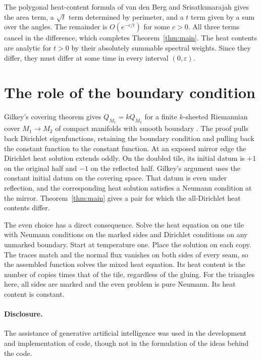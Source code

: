 \documentclass[11pt]{article}
\begin{document}
The polygonal heat-content formula of van den Berg and
Srisatkunarajah \cite[Theorem~1]{bs} gives the area term, a
$\sqrt t$ term determined by perimeter, and a $t$ term given by a
sum over the angles. The remainder is $O(e^{-c/t})$ for some $c>0$.
All three terms cancel in the difference, which completes
Theorem~\ref{thm:main}. The heat contents are analytic for $t>0$ by
their absolutely summable spectral weights. Since they differ, they
must differ at some time in every interval $(0,\varepsilon)$.

\newpage
\section{The role of the boundary condition}\label{sec:mirrors}

Gilkey's covering theorem gives $Q_{M_1}=kQ_{M_2}$ for a finite
$k$-sheeted Riemannian cover $M_1\to M_2$ of compact manifolds with
smooth boundary \cite[Theorem~2.2 and Section~2.5]{gilkey}. The proof pulls
back Dirichlet eigenfunctions, retaining the boundary condition and
pulling back the constant function to the constant function.
At an exposed mirror edge the Dirichlet heat solution extends oddly.
On the doubled tile, its initial datum is $+1$ on the original half
and $-1$ on the reflected half. Gilkey's argument uses the constant
initial datum on the covering space. That datum is even under
reflection, and the corresponding heat solution satisfies a Neumann
condition at the mirror. Theorem~\ref{thm:main} gives a pair for which
the all-Dirichlet heat contents differ.

The even choice has a direct consequence. Solve the heat equation
on one tile with Neumann conditions on the marked sides and
Dirichlet conditions on any unmarked boundary. Start at temperature
one. Place the solution on each copy. The traces match and the
normal flux vanishes on both sides of every seam, so the assembled
function solves the mixed heat equation. Its heat content is the
number of copies times that of the tile, regardless of the gluing.
For the triangles here, all sides are marked and the even problem
is pure Neumann. Its heat content is constant.

\paragraph{Disclosure.} The assistance of generative artificial intelligence was used in the development and implementation of code, though not in the formulation of the ideas behind the code.
\end{document}
